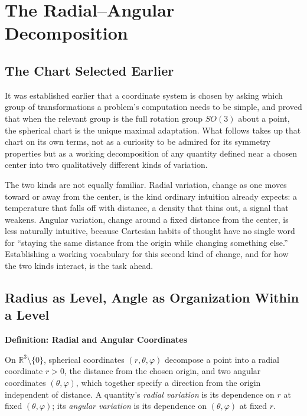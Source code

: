 \documentclass[11pt,fleqn]{book}
\numberwithin{equation}{chapter}
\newenvironment{definition}[1]
  {\begin{definitionEnv}
   \noindent\textbf{Definition: #1}\par\smallskip}
  {\end{definitionEnv}}
\theoremstyle{plain}
\theoremstyle{definition}
\theoremstyle{remark}
\newcommand{\R}{\mathbb{R}}
\providecommand{\enquote}[1]{``#1''}
\begin{document}
\chapter{The Radial--Angular Decomposition}

\section{The Chart Selected Earlier}

It was established earlier that a coordinate system is chosen by asking which group of transformations a problem's computation needs to be simple, and proved that when the relevant group is the full rotation group \(SO(3)\) about a point, the spherical chart is the unique maximal adaptation. What follows takes up that chart on its own terms, not as a curiosity to be admired for its symmetry properties but as a working decomposition of any quantity defined near a chosen center into two qualitatively different kinds of variation.

The two kinds are not equally familiar. Radial variation, change as one moves toward or away from the center, is the kind ordinary intuition already expects: a temperature that falls off with distance, a density that thins out, a signal that weakens. Angular variation, change around a fixed distance from the center, is less naturally intuitive, because Cartesian habits of thought have no single word for \enquote{staying the same distance from the origin while changing something else.} Establishing a working vocabulary for this second kind of change, and for how the two kinds interact, is the task ahead.

\section{Radius as Level, Angle as Organization Within a Level}

\begin{definition}{Radial and Angular Coordinates}
On \(\R^3\setminus\{0\}\), spherical coordinates \((r,\theta,\varphi)\) decompose a point into a radial coordinate \(r>0\), the distance from the chosen origin, and two angular coordinates \((\theta,\varphi)\), which together specify a direction from the origin independent of distance. A quantity's \emph{radial variation} is its dependence on \(r\) at fixed \((\theta,\varphi)\); its \emph{angular variation} is its dependence on \((\theta,\varphi)\) at fixed \(r\).
\end{definition}
\end{document}

